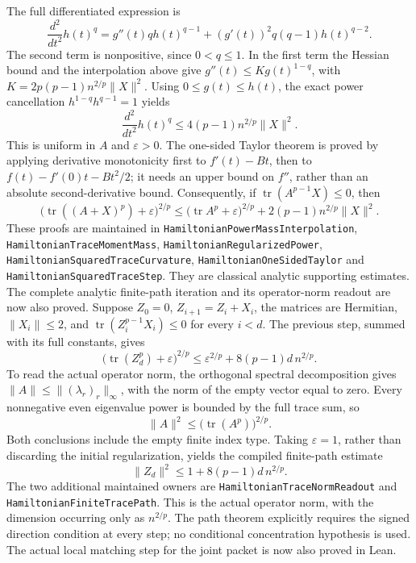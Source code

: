 The full differentiated expression is
\[
 \frac{d^2}{dt^2}h(t)^q
 =g''(t)q h(t)^{q-1}
  +(g'(t))^2q(q-1)h(t)^{q-2}.
\]
The second term is nonpositive, since \(0<q\leq1\).
In the first term the Hessian bound and the interpolation above give
\(g''(t)\leq K g(t)^{1-q}\), with
\(K=2p(p-1)n^{2/p}\|X\|^2\).
Using \(0\leq g(t)\leq h(t)\), the exact power cancellation
\(h^{1-q}h^{q-1}=1\) yields
\[
 \frac{d^2}{dt^2}h(t)^q
 \leq4(p-1)n^{2/p}\|X\|^2.
\]
This is uniform in \(A\) and \(\varepsilon>0\).
The one-sided Taylor theorem is proved by applying derivative
monotonicity first to \(f'(t)-Bt\), then to
\(f(t)-f'(0)t-Bt^2/2\); it needs an upper bound on \(f''\),
rather than an absolute second-derivative bound.
Consequently, if
\(\operatorname{tr}(A^{p-1}X)\leq0\), then
\[
 \boxed{\quad
 \bigl(\operatorname{tr}((A+X)^p)+\varepsilon\bigr)^{2/p}
 \leq
 \bigl(\operatorname{tr}A^p+\varepsilon\bigr)^{2/p}
 +2(p-1)n^{2/p}\|X\|^2 .
 \quad}
\]
These proofs are maintained in
\texttt{HamiltonianPowerMassInterpolation},
\texttt{HamiltonianTraceMomentMass},
\texttt{HamiltonianRegularizedPower},
\texttt{HamiltonianSquaredTraceCurvature},
\texttt{HamiltonianOneSidedTaylor} and
\texttt{HamiltonianSquaredTraceStep}.
They are classical analytic supporting estimates.
The complete analytic finite-path iteration and its operator-norm
readout are now also proved.
Suppose \(Z_0=0\), \(Z_{i+1}=Z_i+X_i\), the matrices are
Hermitian, \(\|X_i\|\leq2\), and
\(\operatorname{tr}(Z_i^{p-1}X_i)\leq0\) for every \(i<d\).
The previous step, summed with its full constants, gives
\[
 \bigl(\operatorname{tr}(Z_d^p)+\varepsilon\bigr)^{2/p}
 \leq \varepsilon^{2/p}+8(p-1)d\,n^{2/p}.
\]
To read the actual operator norm, the orthogonal spectral
decomposition gives
\(\|A\|\leq\|(\lambda_r)_r\|_\infty\), with the norm of the
empty vector equal to zero.
Every nonnegative even eigenvalue power is bounded by the full
trace sum, so
\[
 \|A\|^2\leq\bigl(\operatorname{tr}(A^p)\bigr)^{2/p}.
\]
Both conclusions include the empty finite index type.
Taking \(\varepsilon=1\), rather than discarding the initial
regularization, yields the compiled finite-path estimate
\[
 \boxed{\quad \|Z_d\|^2\leq1+8(p-1)d\,n^{2/p}.\quad}
\]
The two additional maintained owners are
\texttt{HamiltonianTraceNormReadout} and
\texttt{HamiltonianFiniteTracePath}.
This is the actual operator norm, with the dimension occurring only
as \(n^{2/p}\).
The path theorem explicitly requires the signed direction condition
at every step; no conditional concentration hypothesis is used.
The actual local matching step for the joint packet is now also
proved in Lean.

